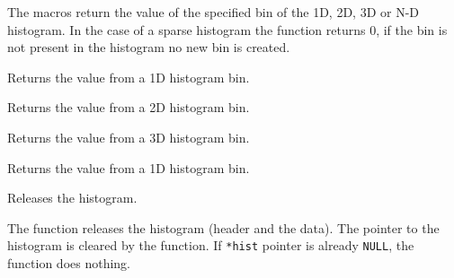 The macros return the value of the specified bin of the 1D, 2D, 3D or N-D histogram. In the case of a sparse histogram the function returns 0, if the bin is not present in the histogram no new bin is created.
\else

Returns the value from a 1D histogram bin.


\begin{description}
\end{description}

Returns the value from a 2D histogram bin.


\begin{description}
\end{description}

Returns the value from a 3D histogram bin.


\begin{description}
\end{description}

Returns the value from a 1D histogram bin.


\begin{description}
\end{description}

\fi

\ifC
{}
Releases the histogram.


\begin{description}
\end{description}

The function releases the histogram (header and the data). The pointer to the histogram is cleared by the function. If \texttt{*hist} pointer is already \texttt{NULL}, the function does nothing.

